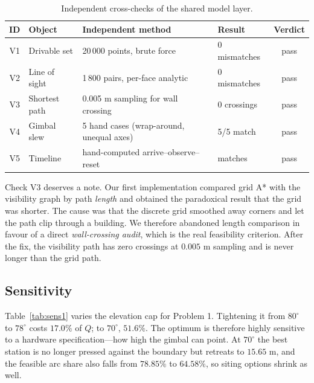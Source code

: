 \documentclass[12pt]{article}
\begin{document}
\begin{table}[htbp]
  \centering
  \caption{Independent cross-checks of the shared model layer.}
  \label{tab:valid}
  \footnotesize
  \begin{tabular}{clllc}
    \toprule
    ID & Object & Independent method & Result & Verdict \\
    \midrule
    V1 & Drivable set & 20\,000 points, brute force & 0 mismatches & pass \\
    V2 & Line of sight & 1\,800 pairs, per-face analytic & 0 mismatches & pass \\
    V3 & Shortest path & 0.005 m sampling for wall crossing & 0 crossings & pass \\
    V4 & Gimbal slew & 5 hand cases (wrap-around, unequal axes) & 5/5 match & pass \\
    V5 & Timeline & hand-computed arrive--observe--reset & matches & pass \\
    \bottomrule
  \end{tabular}
\end{table}

Check V3 deserves a note. Our first implementation compared grid A* with the visibility graph by path \emph{length} and obtained the paradoxical result that the grid was shorter. The cause was that the discrete grid smoothed away corners and let the path clip through a building. We therefore abandoned length comparison in favour of a direct \emph{wall-crossing audit}, which is the real feasibility criterion. After the fix, the visibility path has zero crossings at $0.005$ m sampling and is never longer than the grid path.

\subsection{Sensitivity}

Table~\ref{tab:sens1} varies the elevation cap for Problem 1. Tightening it from $80^\circ$ to $78^\circ$ costs $17.0\%$ of $Q$; to $70^\circ$, $51.6\%$. The optimum is therefore highly sensitive to a hardware specification---how high the gimbal can point. At $70^\circ$ the best station is no longer pressed against the boundary but retreats to $15.65$ m, and the feasible arc share also falls from $78.85\%$ to $64.58\%$, so siting options shrink as well.
\end{document}
